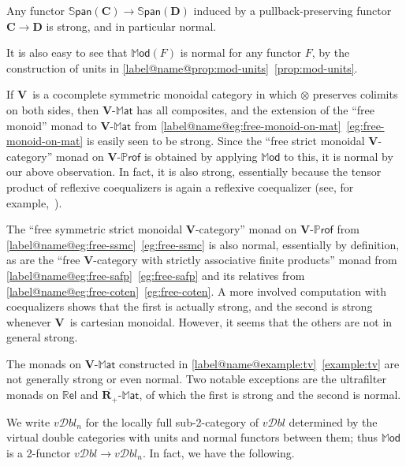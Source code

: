 \documentclass{tac}
\makeatletter
\newcommand{\V}{\ensuremath{\mathbf{V}}}
\newcommand{\mb}[1]{{\mathbf{#1}}}
\newcommand{\eR}{\ensuremath{\overline{\mathbf{R}_+}}}
\newcommand{\MAT}[1]{\mathbf{#1}\mbox{-}\mathbb{M}\mathsf{at}}
\newcommand{\PROF}[1]{\mathbf{#1}\mbox{-}\mathbb{P}\mathsf{rof}}
\newcommand{\SPAN}[1]{\mathbb{S}\mathsf{pan}\!\left(\mb{#1}\right)}
\newcommand{\MOD}{\mathbb{M}\mathsf{od}}
\newcommand{\Rel}{\mathbb{R}\mathsf{el}}
\newcommand{\vDbl}{\ensuremath{\mathit{v}\mathcal{D}\mathit{bl}}}
\newcommand{\vDbln}{\ensuremath{\mathit{v}\mathcal{D}\mathit{bl}_{n}}}
\numberwithin{equation}{section}
\def\currthmtype{}
\def\autoref#1{\ref*{label@name@#1}~\ref{#1}}
\def\autoref#1{\ref{label@name@#1}~\ref{#1}}
\let\old@label\label
\def\label#1{%
    {\let\your@currentlabel\@currentlabel%
      \edef\@currentlabel{\currthmtype}%
      \old@label{label@name@#1}}%
    \old@label{#1}}
\makeatother
\begin{document}
\begin{example}\label{eg:span-strong}
  Any functor $\SPAN{C}\to\SPAN{D}$ induced by a pullback-preserving
  functor $\mb{C}\to\mb{D}$ is strong, and in particular normal.
\end{example}

\begin{example}\label{eg:mod-normal}
  It is also easy to see that $\MOD(F)$ is normal for any functor $F$,
  by the construction of units in \autoref{prop:mod-units}.
\end{example}

\begin{examples}\label{eg:fmc-strong}
  If \V\ is a cocomplete symmetric monoidal category in which $\otimes$
  preserves colimits on both sides, then $\MAT{V}$ has all composites,
  and the extension of the ``free monoid'' monad to $\MAT{V}$ from
  \autoref{eg:free-monoid-on-mat} is easily seen to be strong.  Since
  the ``free strict monoidal \V-category'' monad on $\PROF{V}$ is
  obtained by applying $\MOD$ to this, it is normal by our above
  observation.  In fact, it is also strong, essentially because the
  tensor product of reflexive coequalizers is again a reflexive
  coequalizer (see, for example,~\cite[A1.2.12]{ptj:elephant1}).
\end{examples}

\begin{examples}\label{eg:fssmc-strong}
  The ``free symmetric strict monoidal \V-category'' monad on $\PROF{V}$
  from \autoref{eg:free-ssmc} is also normal, essentially by definition,
  as are the ``free \V-category with strictly associative finite
  products'' monad from \autoref{eg:free-safp} and its relatives from
  \autoref{eg:free-coten}.  A more involved computation with
  coequalizers shows that the first is actually strong, and the second
  is strong whenever \V\ is cartesian monoidal.  However, it seems that
  the others are not in general strong.
\end{examples}

\begin{examples}
  The monads on $\MAT{V}$ constructed in \autoref{example:tv} are not
  generally strong or even normal.  Two notable exceptions are the
  ultrafilter monads on $\Rel$ and $\MAT{\eR}$, of which the first is
  strong and the second is normal.
\end{examples}

We write $\vDbln$ for the locally full sub-2-category of $\vDbl$
determined by the virtual double categories with units and normal
functors between them; thus $\MOD$ is a 2-functor $\vDbl\to\vDbln$.
In fact, we have the following.
\end{document}

